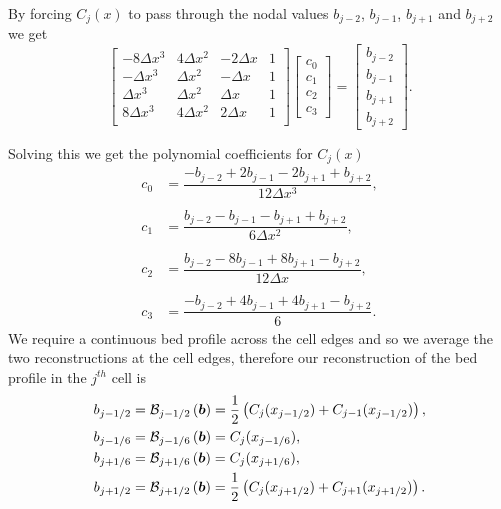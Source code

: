 By forcing $C_j(x)$ to pass through the nodal values $b_{j-2}$, $b_{j-1}$, $b_{j+1}$ and $b_{j+2}$ we get
\begin{equation*}
\begin{bmatrix}
-8\Delta x^3 & 4\Delta x^2  & -2\Delta x & 1\\
-\Delta x^3 & \Delta x^2  &-\Delta x & 1\\
\Delta x^3 & \Delta x^2  & \Delta x & 1\\
8\Delta x^3 & 4\Delta x^2  & 2\Delta x & 1\\
\end{bmatrix}
\begin{bmatrix}
c_0 \\ c_1 \\ c_2 \\ c_3\end{bmatrix} =  \begin{bmatrix}
b_{j-2} \\ b_{j-1}\\ b_{j+1} \\ b_{j+2}
\end{bmatrix}.
\end{equation*}

Solving this we get the polynomial coefficients for $C_j(x)$
\begin{align*}
c_0 &=  \dfrac{-b_{j-2} + 2b_{j-1} - 2 b_{j+1} + b_{j+2}}{12 \Delta x^3},\\ \\
c_1 &=  \dfrac{b_{j-2} - b_{j-1} - b_{j+1} + b_{j+2}}{6 \Delta x^2},\\ \\
c_2 &=  \dfrac{b_{j-2} - 8b_{j-1} + 8 b_{j+1} - b_{j+2}}{12 \Delta x},\\ \\
c_3 &=  \dfrac{-b_{j-2}  + 4b_{j-1} + 4 b_{j+1} - b_{j+2}}{6}.
\end{align*}
We require a continuous bed profile across the cell edges and so we average the two reconstructions at the cell edges, therefore our reconstruction of the bed profile in the $j^{th}$ cell is
\begin{subequations}
\begin{align}
b_{j-1/2} &=  \mathcal{B}_{j-1/2}\left(\boldsymbol{b}\right) =  \frac{1}{2}\left( C_j(x_{j-1/2}) + C_{j-1}(x_{j-1/2})\right),\\
b_{j-1/6} &=  \mathcal{B}_{j-1/6}\left(\boldsymbol{b}\right) =  C_j(x_{j-1/6}),\\
b_{j+1/6} &=  \mathcal{B}_{j+1/6}\left(\boldsymbol{b}\right) =  C_j(x_{j+1/6}),\\
b_{j+1/2} &=  \mathcal{B}_{j+1/2}\left(\boldsymbol{b}\right) =  \frac{1}{2}\left( C_j(x_{j+1/2}) + C_{j+1}(x_{j+1/2})\right).
\end{align}
\label{eqn:FEVMbedrecon}
\end{subequations}



